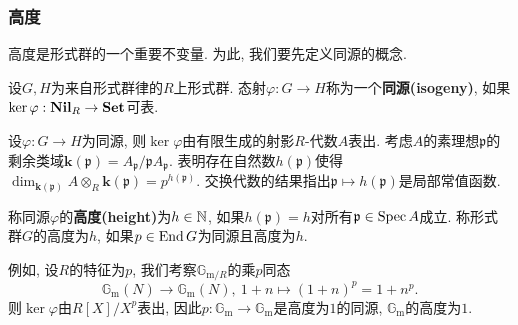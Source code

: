 \subsubsection{高度}
高度是形式群的一个重要不变量. 为此, 我们要先定义同源的概念. 
\begin{definition}
    设$G, H$为来自形式群律的$R$上形式群. 态射$\varphi : G\to H$称为一个\textbf{同源(isogeny)},
    如果$\ker\varphi : \mathbf{Nil}_R\to \mathbf{Set}$可表.
\end{definition}

设$\varphi : G\to H$为同源, 则$\ker\varphi$由有限生成的射影$R$-代数$A$表出. 
考虑$A$的素理想$\mathfrak{p}$的剩余类域$\mathbf{k}(\mathfrak{p}) = A_\mathfrak{p}/\mathfrak{p}A_\mathfrak{p}$. \cite[Theorem 5.3]{Zi84}表明存在自然数$h(\mathfrak{p})$使得$\dim_{\mathbf{k}(\mathfrak{p})} A\otimes_R\mathbf{k}(\mathfrak{p}) = p^{h(\mathfrak{p})}$.
交换代数的结果指出$\mathfrak{p}\mapsto h(\mathfrak{p})$是局部常值函数.
\begin{definition}
    称同源$\varphi$的\textbf{高度(height)}为$h\in\mathbb{N}$, 如果$h(\mathfrak{p}) = h$对所有$\mathfrak{p}\in\operatorname{Spec} A$成立.
    称形式群$G$的高度为$h$, 如果$p\in\operatorname{End} G$为同源且高度为$h$.
\end{definition}

例如, 设$R$的特征为$p$, 我们考察$\mathbb{G}_{\mathrm{m}/R}$的乘$p$同态\[\mathbb{G}_{\mathrm{m}}(N)\to\mathbb{G}_{\mathrm{m}}(N),\ 1 + n\mapsto (1+n)^p = 1 + n^p.\]
则$\ker\varphi$由$R[X]/X^p$表出, 因此$p : \mathbb{G}_{\mathrm{m}}\to \mathbb{G}_{\mathrm{m}}$是高度为$1$的同源, $\mathbb{G}_{\mathrm{m}}$的高度为$1$.